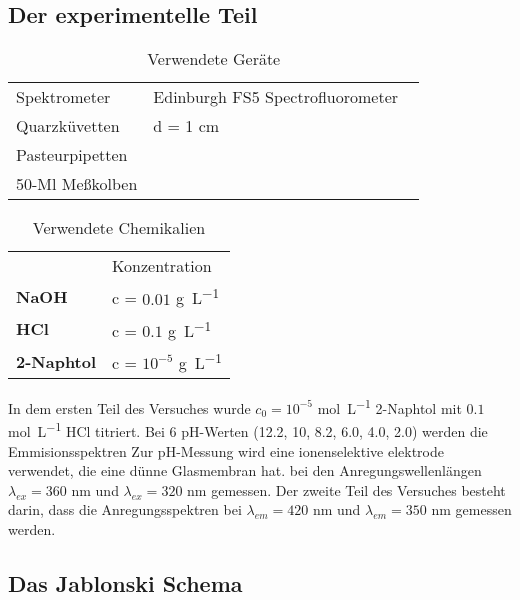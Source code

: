 \documentclass[12pt]{article}
\begin{document}
\subsection{Der experimentelle Teil}

\begin{table}[!ht]
  \begin{tabular}{ll}
    Spektrometer & Edinburgh FS5 Spectrofluorometer ~\supercite{edin}   \\
    Quarzküvetten & d = 1 \si{\centi\meter}   \\
    Pasteurpipetten & \\
    50-Ml Meßkolben &    \\
  \end{tabular}
  \caption{Verwendete Geräte}
\end{table}

\begin{table}[!ht]
  \begin{tabular}{ll}
    &Konzentration\\ 
    \textbf{NaOH} & c = $0.01$ \si{\gram\per\liter}   \\
    \textbf{HCl} & c = $0.1$ \si{\gram\per\liter}   \\
    \textbf{2-Naphtol} & c = $10^{-5}$ \si{\gram\per\liter}   \\
  \end{tabular}
  \caption{Verwendete Chemikalien}
\end{table}

In dem ersten Teil des Versuches wurde $c_0 = 10^{-5}$ \si{\mol\per\liter} 2-Naphtol mit $0.1$ 
\si{\mol\per\liter} HCl titriert. Bei 6 pH-Werten (12.2, 10, 8.2, 6.0, 4.0, 2.0) werden die Emmisionsspektren 
Zur pH-Messung wird eine ionenselektive elektrode verwendet, die eine dünne Glasmembran hat.   
bei den Anregungswellenlängen $\lambda_{ex}=360$ \si{\nano\meter} und $\lambda_{ex}=320$ \si{\nano\meter} gemessen.
Der zweite Teil des Versuches besteht darin, dass die Anregungsspektren bei  
$\lambda_{em}=420$ \si{\nano\meter} und $\lambda_{em}=350$ \si{\nano\meter} gemessen werden.

\subsection{Das Jablonski Schema} %
\label{sub:jablonski_schema}
\end{document}
